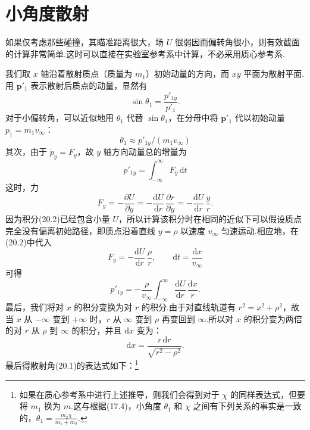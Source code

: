 \section{小角度散射}

如果仅考虑那些碰撞，其瞄准距离很大，场 $U$ 很弱因而偏转角很小，则有效截面的计算非常简单.这时可以直接在实验室参考系中计算，不必采用质心参考系.

我们取 $x$ 轴沿着散射质点（质量为 $m_1$）初始动量的方向，而 $xy$ 平面为散射平面.用 $\boldsymbol{p}'_1$ 表示散射后质点的动量，显然有
\begin{equation*}
  \sin\theta_1=\frac{p'_{1y}}{p'_1}.
\end{equation*}
对于小偏转角，可以近似地用 $\theta_1$ 代替 $\sin\theta_1$，在分母中将 $\boldsymbol{p}'_1$ 代以初始动量 $p_1=m_1v_\infty$：
\begin{equation}
  \theta_1\approx p'_{1y}/(m_1v_\infty)
\end{equation}
其次，由于 $\dot{p}_y=F_y$，故 $y$ 轴方向动量总的增量为
\begin{equation}
  p'_{1y}=\int_{-\infty}^{\infty}F_y\,\mathrm{d}t
\end{equation}
这时，力
\begin{equation*}
  F_y=-\frac{\partial U}{\partial y}
  =-\frac{\mathrm{d}U}{\mathrm{d}r}\,\frac{\partial r}{\partial y}
  =-\frac{\mathrm{d}U}{\mathrm{d}r}\,\frac{y}{r}.
\end{equation*}
因为积分(20.2)已经包含小量 $U$，所以计算该积分时在相同的近似下可以假设质点完全没有偏离初始路径，即质点沿着直线 $y=\rho$ 以速度 $v_\infty$ 匀速运动.相应地，在(20.2)中代入
\begin{equation*}
  F_y=-\frac{\mathrm{d}U}{\mathrm{d}r}\,\frac{\rho}{r},\qquad
  \mathrm{d}t=\frac{\mathrm{d}x}{v_\infty}
\end{equation*}
可得
\begin{equation*}
  p'_{1y}=-\frac{\rho}{v_\infty}\int_{-\infty}^{\infty}
  \frac{\mathrm{d}U}{\mathrm{d}r}\,\frac{\mathrm{d}x}{r}.
\end{equation*}
最后，我们将对 $x$ 的积分变换为对 $r$ 的积分.由于对直线轨道有 $r^2=x^2+\rho^2$，故当 $x$ 从 $-\infty$ 变到 $+\infty$ 时，$r$ 从 $\infty$ 变到 $\rho$ 再变回到 $\infty$.所以对 $x$ 的积分变为两倍的对 $r$ 从 $\rho$ 到 $\infty$ 的积分，并且 $\mathrm{d}x$ 变为：
\begin{equation*}
  \mathrm{d}x=\frac{r\,\mathrm{d}r}{\sqrt{r^2-\rho^2}}.
\end{equation*}
最后得散射角(20.1)的表达式如下：\footnote{如果在质心参考系中进行上述推导，则我们会得到对于 $\chi$ 的同样表达式，但要将 $m_1$ 换为 $m$.这与根据(17.4)，小角度 $\theta_1$ 和 $\chi$ 之间有下列关系的事实是一致的，$\theta_1=\frac{m_2\chi}{m_1+m_2}$.}
